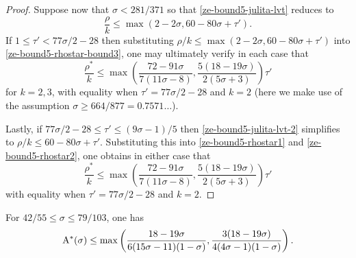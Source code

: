 \begin{proof}
Suppose now that $\sigma < 281/371$ so that \eqref{ze-bound5-julita-lvt} reduces to
\begin{equation}\label{ze-bound5-julita-lvt-2}
\frac{\rho}{k} \le \max(2 - 2\sigma, 60 - 80\sigma + \tau').
\end{equation}
If $1 \le \tau' < 77\sigma/2 - 28$ then substituting $\rho/k \le \max(2 - 2\sigma, 60 - 80\sigma + \tau')$ into \eqref{ze-bound5-rhostar-bound3}, one may ultimately verify in each case that
\[
\frac{\rho^*}{k} \le \max\left(\frac{72 - 91\sigma}{7(11\sigma - 8)}, \frac{5(18 - 19\sigma)}{2(5\sigma + 3)}\right)\tau'
\]
for $k = 2,3$, with equality when $\tau' = 77\sigma/2 - 28$ and $k = 2$ (here we make use of the assumption $\sigma \ge 664/877 = 0.7571\ldots$).

Lastly, if $77\sigma/2 - 28 \le \tau' \le (9\sigma - 1)/5$ then \eqref{ze-bound5-julita-lvt-2} simplifies to $\rho/k \le 60-80\sigma+\tau'$. Substituting this into \eqref{ze-bound5-rhostar1} and \eqref{ze-bound5-rhostar2}, one obtains in either case that
\[
\frac{\rho^*}{k} \le \max\left(\frac{72 - 91\sigma}{7(11\sigma - 8)}, \frac{5(18 - 19\sigma)}{2(5\sigma + 3)}\right)\tau'
\]
with equality when $\tau' = 77\sigma/2 - 28$ and $k = 2$.
\end{proof}

\begin{theorem}\label{imp-energy-bound6}
For $42/55 \le \sigma \le 79/103$, one has
\[
\mathrm{A}^*(\sigma) \le \max\left(\frac{18 - 19\sigma}{6(15\sigma - 11)(1- \sigma)}, \frac{3(18-19\sigma)}{4(4\sigma-1)(1 - \sigma)}\right).
\]
\end{theorem}
\derived
{}

